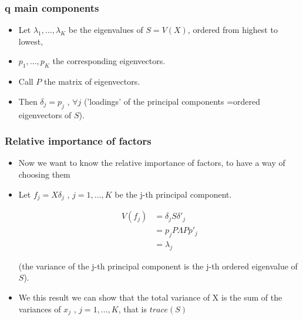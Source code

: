 \documentclass[
  shownotes,
  xcolor={svgnames},
  hyperref={colorlinks,citecolor=DarkBlue,linkcolor=DarkRed,urlcolor=DarkBlue}
  , aspectratio=169]{beamer}
\begin{document}
\begin{frame}
\frametitle{q main components}

\begin{itemize}
\item Let $\lambda_1,\dots,\lambda_K$ be the eigenvalues of $S = V(X)$, ordered from highest to lowest, 
\medskip
\item $p_1 , \dots , p_K$ the corresponding eigenvectors. 
\medskip
\item Call $P$ the matrix of eigenvectors.
\medskip
\item Then $\delta_j = p_j$ , $\forall j$ ('loadings' of the principal components =ordered eigenvectors of $S$).
\end{itemize}

\end{frame}

\begin{frame}
\frametitle{Relative importance of factors}

\begin{itemize}
\item Now we want to know the relative importance of factors, to have a way of choosing them
\medskip
\item Let $f_j = X \delta_j$ , $j = 1, \dots, K$ be the j-th principal component. 

\medskip


\begin{align}
V (f_j ) &= \delta_j S \delta'_j  \\
          &= p_j P \Lambda P p'_j  \\
          &= \lambda_j
\end{align}

(the variance of the j-th principal component is the j-th ordered eigenvalue of $S$).

\medskip
\item We this result we can show that the total variance of X is the sum of the variances of $x_j$ , $j = 1, ..., K$, that is $trace(S)$
\end{itemize}
\end{frame}
\end{document}

